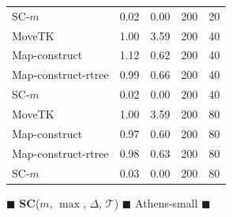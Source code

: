 \documentclass[11pt]{article}
\begin{document}
\begin{figure}
\begin{center}
\begin{minipage}{0.5\textwidth}
\begin{tabular}{@{}lrrrr@{}}
        \medskip
SC-$m$ & 0.02 & 0.00 & 200 & 20\\
        MoveTK & 1.00 & 3.59 & 200 & 40\\
Map-construct & 1.12 & 0.62 & 200 & 40\\
Map-construct-rtree & 0.99 & 0.66 & 200 & 40\\
        \medskip
SC-$m$ & 0.02 & 0.00 & 200 & 40\\
        MoveTK & 1.00 & 3.59 & 200 & 80\\
Map-construct & 0.97 & 0.60 & 200 & 80\\
Map-construct-rtree & 0.98 & 0.63 & 200 & 80\\
        \medskip
SC-$m$ & 0.03 & 0.00 & 200 & 80\\
        \bottomrule
    \end{tabular}
\end{minipage}
%
        \caption{$\blacksquare$ \textbf{SC}($m$, $\max$, $\Delta$, $\mathcal{T}$) $\blacksquare$ Athens-small $\blacksquare$}
%
    \end{center} \end{figure}
\clearpage
\newpage 
%
\clearpage
%
\end{document}
